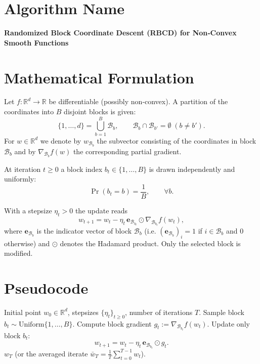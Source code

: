 \documentclass[11pt]{article}
\newcommand{\RR}{\mathbb{R}}
\newcommand{\grad}{\nabla}
\newcommand{\block}[1]{\mathcal{B}_{#1}}
\begin{document}
\section*{Algorithm Name}
\textbf{Randomized Block Coordinate Descent (RBCD) for Non‑Convex Smooth Functions}

\section*{Mathematical Formulation}
Let $f:\RR^{d}\rightarrow\RR$ be differentiable (possibly non‑convex).  
A partition of the coordinates into $B$ disjoint blocks is given:
\[
\{1,\dots ,d\}= \bigcup_{b=1}^{B}\block{b},\qquad
\block{b}\cap\block{b'}=\emptyset\;(b\neq b').
\]
For $w\in\RR^{d}$ we denote by $w_{\block{b}}$ the subvector consisting of the
coordinates in block $\block{b}$ and by $\grad_{\block{b}} f(w)$ the corresponding
partial gradient.

At iteration $t\ge 0$ a block index $b_t\in\{1,\dots ,B\}$ is drawn
independently and uniformly:
\[
\Pr(b_t = b)=\frac1B,\qquad \forall b.
\]

With a stepsize $\eta_t>0$ the update reads
\begin{equation}
\label{eq:update}
w_{t+1}=w_t - \eta_t\, \mathbf{e}_{\block{b_t}}\odot \grad_{\block{b_t}} f(w_t),
\end{equation}
where $\mathbf{e}_{\block{b}}$ is the indicator vector of block $\block{b}$
(i.e. $(\mathbf{e}_{\block{b}})_i=1$ if $i\in\block{b}$ and $0$ otherwise) and
$\odot$ denotes the Hadamard product.  Only the selected block is modified.

\section*{Pseudocode}
\begin{algorithm}[H]
\caption{Randomized Block Coordinate Descent (RBCD)}
\begin{algorithmic}[1]
\REQUIRE Initial point $w_0\in\RR^{d}$, stepsizes $\{\eta_t\}_{t\ge0}$, number of iterations $T$.
    \STATE Sample block $b_t\sim \text{Uniform}\{1,\dots ,B\}$.
    \STATE Compute block gradient $g_t:=\grad_{\block{b_t}} f(w_t)$.
    \STATE Update only block $b_t$:
    \[
    w_{t+1}= w_t - \eta_t\,\mathbf{e}_{\block{b_t}}\odot g_t .
    \]
\ENDFOR
\RETURN $w_T$ (or the averaged iterate $\bar w_T=\frac1T\sum_{t=0}^{T-1}w_t$).
\end{algorithmic}
\end{algorithm}
\end{document}

